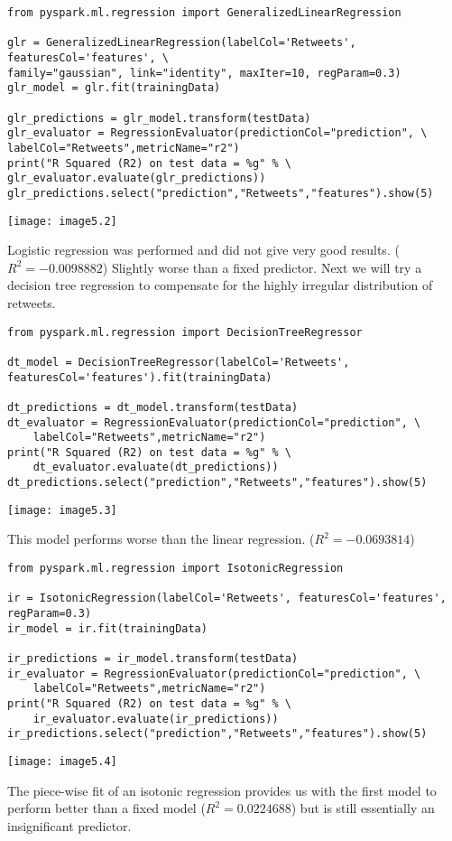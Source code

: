 \documentclass[]{article}
\begin{document}
\begin{verbatim}
from pyspark.ml.regression import GeneralizedLinearRegression

glr = GeneralizedLinearRegression(labelCol='Retweets', featuresCol='features', \
family="gaussian", link="identity", maxIter=10, regParam=0.3)
glr_model = glr.fit(trainingData)

glr_predictions = glr_model.transform(testData)
glr_evaluator = RegressionEvaluator(predictionCol="prediction", \
labelCol="Retweets",metricName="r2")
print("R Squared (R2) on test data = %g" % \
glr_evaluator.evaluate(glr_predictions))
glr_predictions.select("prediction","Retweets","features").show(5)
\end{verbatim}
\texttt{[image: image5.2]} %

Logistic regression was performed and did not give very good results. 
($R^2 = -0.0098882$)
Slightly worse than a fixed predictor. 
Next we will try a decision tree regression to compensate for the highly irregular distribution of retweets.

\begin{verbatim}
from pyspark.ml.regression import DecisionTreeRegressor

dt_model = DecisionTreeRegressor(labelCol='Retweets', featuresCol='features').fit(trainingData)

dt_predictions = dt_model.transform(testData)
dt_evaluator = RegressionEvaluator(predictionCol="prediction", \
	labelCol="Retweets",metricName="r2")
print("R Squared (R2) on test data = %g" % \
	dt_evaluator.evaluate(dt_predictions))
dt_predictions.select("prediction","Retweets","features").show(5)
\end{verbatim}
\texttt{[image: image5.3]} %

This model performs worse than the linear regression.
($R^2 = -0.0693814$)


\begin{verbatim}
from pyspark.ml.regression import IsotonicRegression

ir = IsotonicRegression(labelCol='Retweets', featuresCol='features', regParam=0.3)
ir_model = ir.fit(trainingData)

ir_predictions = ir_model.transform(testData)
ir_evaluator = RegressionEvaluator(predictionCol="prediction", \
	labelCol="Retweets",metricName="r2")
print("R Squared (R2) on test data = %g" % \
	ir_evaluator.evaluate(ir_predictions))
ir_predictions.select("prediction","Retweets","features").show(5)
\end{verbatim}
\texttt{[image: image5.4]} %

The piece-wise fit of an isotonic regression provides 
us with the first model to perform better than a fixed model 
($R^2 = 0.0224688$)
but is still essentially an insignificant predictor.
\end{document}
